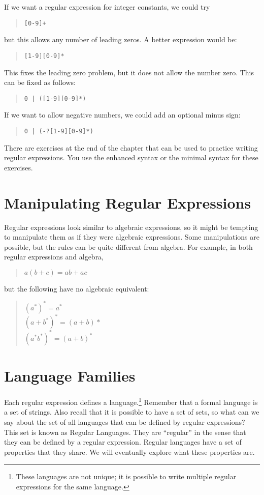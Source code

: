 \documentclass[letterpaper,12pt,openany,reqno]{book}%
\newcommand{\code}[1] {\lstinline[breaklines=yes,breakatwhitespace=yes]{#1}}
\begin{document}
If we want a regular expression for integer constants, we could try
\begin{quote}\code{[0-9]+}\end{quote}
but this allows any number of leading zeros. A better expression would be:
\begin{quote}\code{[1-9][0-9]*}\end{quote}
This fixes the leading zero problem, but it does not allow the number zero. This can be fixed as follows:
\begin{quote}\code{0 | ([1-9][0-9]*)}\end{quote}
If we want to allow negative numbers, we could add an optional minus sign:
\begin{quote}\code{0 | (-?[1-9][0-9]*)}\end{quote}

There are exercises at the end of the chapter that can be used to practice writing regular expressions. You use the enhanced syntax or the minimal syntax for these exercises.

\section{Manipulating Regular Expressions}

Regular expressions look similar to algebraic expressions, so it might be tempting to manipulate them as if they were algebraic expressions. Some manipulations are possible, but the rules can be quite different from algebra. For example, in both regular expressions and algebra,
\begin{quote}
$a(b+c) = ab + ac$
\end{quote}
but the following have no algebraic equivalent:
\begin{quote}
$(a^*)^* = a^*$\\
$(a+b^*)^* = (a+b)*$\\
$(a^*b^*)^* = (a+b)^*$
\end{quote}

\section{Language Families}
Each regular expression defines a language.\footnote{These languages are not unique; it is possible to write multiple regular expressions for the same language.} Remember that a formal language is a set of strings. Also recall that it is possible to have a set of sets, so what can we say about the set of all languages that can be defined by regular expressions? This set is known as Regular Languages. They are ``regular'' in the sense that they can be defined by a regular expression. Regular languages have a set of properties that they share. We will eventually explore what these properties are. 
\end{document}
